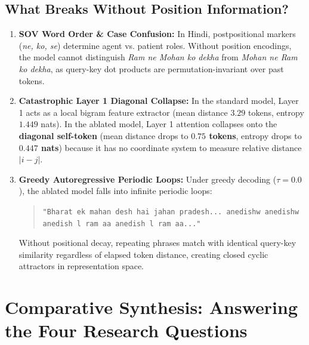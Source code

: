 \documentclass[11pt,a4paper]{article}
\begin{document}
\subsection{What Breaks Without Position Information?}
\begin{enumerate}[noitemsep]
    \item \textbf{SOV Word Order \& Case Confusion:} In Hindi, postpositional markers (\textit{ne, ko, se}) determine agent vs. patient roles. Without position encodings, the model cannot distinguish \textit{Ram ne Mohan ko dekha} from \textit{Mohan ne Ram ko dekha}, as query-key dot products are permutation-invariant over past tokens.
    \item \textbf{Catastrophic Layer 1 Diagonal Collapse:} In the standard model, Layer 1 acts as a local bigram feature extractor (mean distance $3.29$ tokens, entropy $1.449$ nats). In the ablated model, Layer 1 attention collapses onto the \textbf{diagonal self-token} (mean distance drops to \textbf{$0.75$ tokens}, entropy drops to \textbf{$0.447$ nats}) because it has no coordinate system to measure relative distance $|i - j|$.
    \item \textbf{Greedy Autoregressive Periodic Loops:} Under greedy decoding ($\tau = 0.0$), the ablated model falls into infinite periodic loops:
    \begin{quote}
    \small \texttt{"Bharat ek mahan desh hai jahan pradesh... anedishw anedishw anedish l ram aa anedish l ram aa..."}
    \end{quote}
    Without positional decay, repeating phrases match with identical query-key similarity regardless of elapsed token distance, creating closed cyclic attractors in representation space.
\end{enumerate}

\section{Comparative Synthesis: Answering the Four Research Questions}
\end{document}
